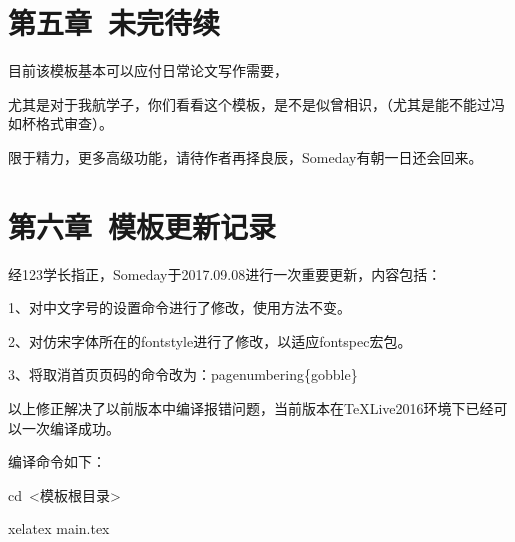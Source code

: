 \documentclass{ctexart}
\begin{document}

\clearpage

\section{第五章\ 未完待续}

目前该模板基本可以应付日常论文写作需要，\par
尤其是对于我航学子，你们看看这个模板，是不是似曾相识，（尤其是能不能过冯如杯格式审查）。\par
限于精力，更多高级功能，请待作者再择良辰，Someday有朝一日还会回来。

\section{第六章\ 模板更新记录}

经123学长指正，Someday于2017.09.08进行一次重要更新，内容包括：\par
1、对中文字号的设置命令进行了修改，使用方法不变。\par
2、对仿宋字体所在的fontstyle进行了修改，以适应fontspec宏包。\par
3、将取消首页页码的命令改为：pagenumbering\{gobble\} \par

以上修正解决了以前版本中编译报错问题，当前版本在TeXLive2016环境下已经可以一次编译成功。 \par

编译命令如下： \par
cd\ <模板根目录> \par
xelatex main.tex \par

\ \\
\ \\



\end{document}
